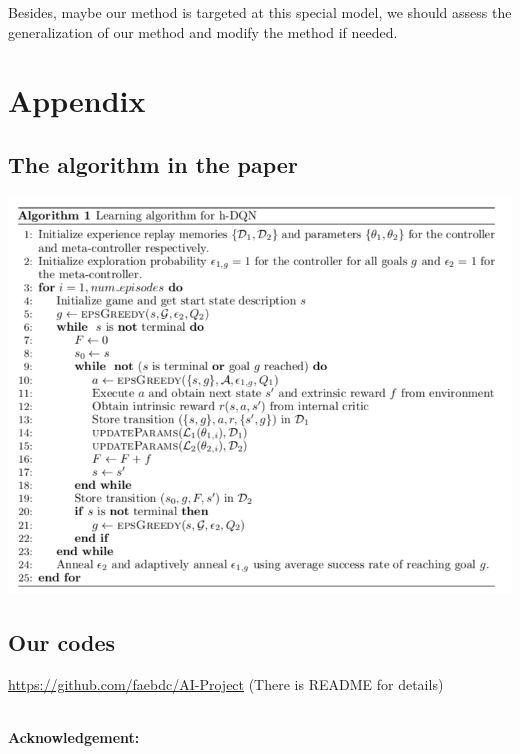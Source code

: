 \documentclass{article}
\newcommand{\Acknowledgement}[1]{\ \\{\bf Acknowledgement:} #1}
\begin{document}
\begin{spacing}{1.1}
    Besides, maybe our method is targeted at this special model, we should assess the generalization of our method and modify the method if needed.


    \section*{Appendix}

    \subsection*{The algorithm in the paper}
    \begin{center}
        \includegraphics[width = \textwidth]{pseudo.png}
    \end{center}

    \subsection*{Our codes}\label{code}
    \url{https://github.com/faebdc/AI-Project}
    (There is README for details)

    
    

    \Acknowledgement{}


    \end{spacing}
    
\end{document}
